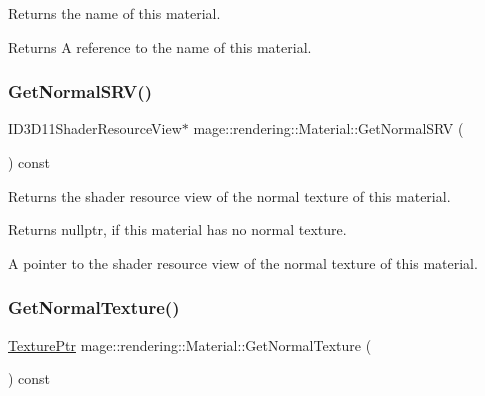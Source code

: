 Returns the name of this material.

\begin{DoxyReturn}{Returns}
A reference to the name of this material. 
\end{DoxyReturn}
\hypertarget{classmage_1_1rendering_1_1_material_a8617392cee8e8609671be3f4147a5934}{}\label{classmage_1_1rendering_1_1_material_a8617392cee8e8609671be3f4147a5934} 
\subsubsection{\texorpdfstring{Get\+Normal\+S\+R\+V()}{GetNormalSRV()}}
{\footnotesize\ttfamily I\+D3\+D11\+Shader\+Resource\+View$\ast$ mage\+::rendering\+::\+Material\+::\+Get\+Normal\+S\+RV (\begin{DoxyParamCaption}{ }\end{DoxyParamCaption}) const\hspace{0.3cm}{\ttfamily [noexcept]}}

Returns the shader resource view of the normal texture of this material.

\begin{DoxyReturn}{Returns}
{\ttfamily nullptr}, if this material has no normal texture. 

A pointer to the shader resource view of the normal texture of this material. 
\end{DoxyReturn}
\hypertarget{classmage_1_1rendering_1_1_material_a1ae7786ebd627d3e7ecaf2dc671f497d}{}\label{classmage_1_1rendering_1_1_material_a1ae7786ebd627d3e7ecaf2dc671f497d} 
\subsubsection{\texorpdfstring{Get\+Normal\+Texture()}{GetNormalTexture()}}
{\footnotesize\ttfamily \hyperlink{namespacemage_1_1rendering_a6f3ae54f825328465b0cdde0f0de4a36}{Texture\+Ptr} mage\+::rendering\+::\+Material\+::\+Get\+Normal\+Texture (\begin{DoxyParamCaption}{ }\end{DoxyParamCaption}) const\hspace{0.3cm}{\ttfamily [noexcept]}}

